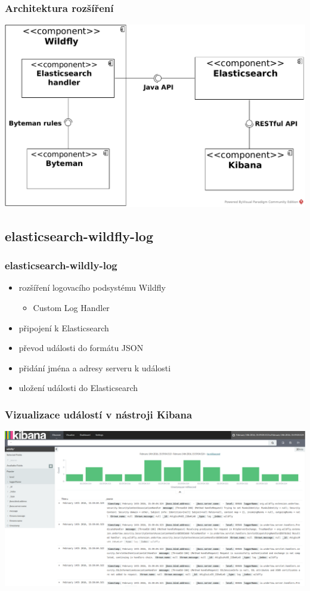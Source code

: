 \documentclass{beamer}
\begin{document}
\begin{frame}
\frametitle{Architektura rozšíření}
\includegraphics[width=\textwidth]{../images/component_diagram}
\end{frame}


\subsection{elasticsearch-wildfly-log}

\begin{frame}
	\frametitle{elasticsearch-wildly-log}
	\begin{itemize}
		\item rozšíření logovacího podsystému Wildfly
		\begin{itemize}
			\item Custom Log Handler
		\end{itemize}
		\item připojení k Elasticsearch
		\item převod události do formátu JSON
		\item přidání jména a adresy serveru k události
		\item uložení události do Elasticsearch
	\end{itemize}
\end{frame}

\begin{frame}
\frametitle{Vizualizace událostí v nástroji Kibana}
\includegraphics[width=\textwidth]{kibana}
\end{frame}
\end{document}

